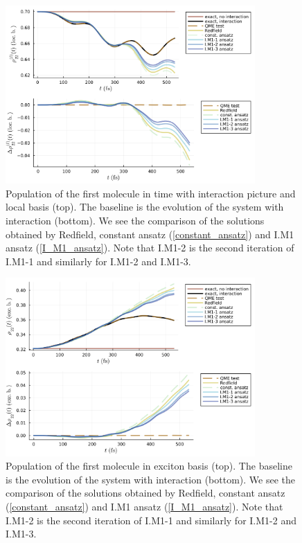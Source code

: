 \newpage
\begin{figure}[H]
\centering
\includegraphics[width=0.85\textwidth]{img/ansatz/iterative04_joined_intloc22.png}
\caption{Population of the first molecule in time with interaction picture and local basis (top). The baseline is the evolution of the system with interaction (bottom). We see the comparison of the solutions obtained by Redfield, constant ansatz (\ref{constant_ansatz}) and I.M1 ansatz (\ref{I_M1_ansatz}). Note that I.M1-2 is the second iteration of I.M1-1 and similarly for I.M1-2 and I.M1-3.}
\label{img:iterative04_joined_intloc22}
\end{figure}

\begin{figure}[H]
\centering
\includegraphics[width=0.85\textwidth]{img/ansatz/iterative04_joined_schexc22.png}
\caption{Population of the first molecule in exciton basis (top). The baseline is the evolution of the system with interaction (bottom). We see the comparison of the solutions obtained by Redfield, constant ansatz (\ref{constant_ansatz}) and I.M1 ansatz (\ref{I_M1_ansatz}). Note that I.M1-2 is the second iteration of I.M1-1 and similarly for I.M1-2 and I.M1-3.}
\label{img:iterative04_joined_schexc22}
\end{figure}

